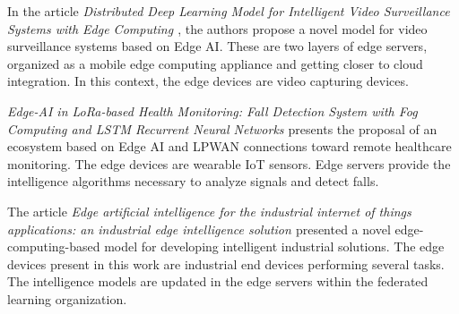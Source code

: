 
In the article \textit{Distributed Deep Learning Model for Intelligent Video Surveillance Systems with Edge Computing \cite{chen2019distributed}}, the authors propose a novel model for video surveillance systems based on Edge AI. These are two layers of edge servers, organized as a mobile edge computing appliance and getting closer to cloud integration. In this context, the edge devices are video capturing devices.



\textit{Edge-AI in LoRa-based Health Monitoring: Fall Detection System with Fog Computing and LSTM Recurrent Neural Networks \cite{queralta2019edge}} presents the proposal of an ecosystem based on Edge AI and LPWAN connections toward remote healthcare monitoring. The edge devices are wearable IoT sensors. Edge servers provide the intelligence algorithms necessary to analyze signals and detect falls.




The article \textit{Edge artificial intelligence for the industrial internet of things applications: an industrial edge intelligence solution \cite{foukalas2021edge}} presented a novel edge-computing-based model for developing intelligent industrial solutions. The edge devices present in this work are industrial end devices performing several tasks. The intelligence models are updated in the edge servers within the federated learning organization.


